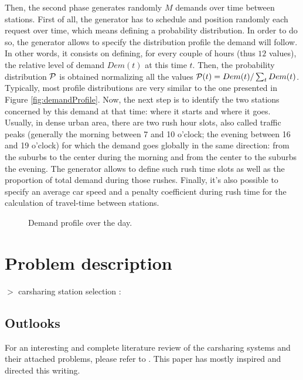 \begin{bibunit}[ieeetr]
\medskip
Then, the second phase generates randomly $M$ demands over time between stations. First of all, the generator has to schedule and position randomly each request over time, which means defining a probability distribution. In order to do so, the generator allows to specify the distribution profile the demand will follow. In other words, it consists on defining, for every couple of hours (thus $12$ values), the relative level of demand $Dem(t)$ at this time $t$. Then, the probability distribution $\mathcal{P}$ is obtained normalizing all the values \ie ${\mathcal{P}}(t) = Dem(t) \slash \sum_{t}{Dem(t)}$. Typically, most profile distributions are very similar to the one presented in Figure \ref{fig:demandProfile}.
Now, the next step is to identify the two stations concerned by this demand at that time: where it starts and where it goes. Usually, in dense urban area, there are two rush hour slots, also called traffic peaks (generally the morning between 7 and 10 o'clock; the evening between 16 and 19 o'clock) for which the demand goes globally in the same direction: from the suburbs to the center during the morning and from the center to the suburbs the evening. The generator allows to define such rush time slots as well as the proportion of total demand during those rushes. Finally, it's also possible to specify an average car speed and a penalty coefficient during rush time for the calculation of travel-time between stations.

\begin{figure}[t]
\centering

\caption{Demand profile over the day.}
\label{fig:plotDemandProfile}
\end{figure}

\newpage
\section{Problem description}
$>$ carsharing station selection : \cite{ion_site_2009}

\subsection{Outlooks}
For an interesting and complete literature review of the carsharing systems and their attached problems, please refer to \cite{jorge_carsharing_2013}.
This paper has mostly inspired and directed this writing.



\end{bibunit}
